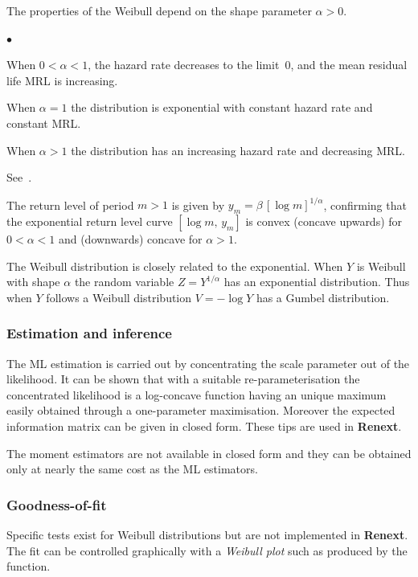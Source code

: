 \documentclass[a4paper]{report}
\begin{document}
The properties of the Weibull depend on the shape parameter $\alpha>0$. 

\begin{list}{$\bullet$}{\setlength{\itemsep}{2pt}\setlength{\topsep}{2pt}}
  
\item When $0 < \alpha < 1$, the hazard rate decreases to the
  limit~$0$, and the mean residual life MRL is increasing.
  
\item When $\alpha = 1$ the distribution is exponential with
  constant hazard rate and constant MRL.
  
\item When $\alpha > 1$ the distribution has an increasing hazard rate
  and decreasing MRL.

\end{list}
See~\citet{BAGNOLIBERGSTROM}.

The return level of period $m>1$ is given by $y_m = \beta \,\left[\log
  m\right]^{1/\alpha}$, confirming that the exponential return level
curve $[\log m,\, y_m]$ is convex (concave upwards) for $0 < \alpha <
1$ and (downwards) concave for $\alpha > 1$.

The Weibull distribution is closely related to the exponential.  When
$Y$ is Weibull with shape $\alpha$ the random variable
$Z=Y^{1/\alpha}$ has an exponential distribution.  Thus when $Y$
follows a Weibull distribution $V=-\log Y$ has a Gumbel distribution.

\subsubsection*{Estimation and inference}
The ML estimation is carried out by concentrating the scale parameter
out of the likelihood. It can be shown that with a suitable re-parameterisation
the concentrated likelihood  is a log-concave function having an unique maximum
easily obtained through a one-parameter maximisation.
Moreover the expected information matrix can be given in closed form. 
These tips are used in \textbf{Renext}.
%

The moment estimators are not available in closed form and they can be
obtained only at nearly the same cost as the ML estimators.


\subsubsection*{Goodness-of-fit}
Specific tests exist for Weibull distributions but are not implemented
in \textbf{Renext}. The fit can be controlled graphically
with a\textit{ Weibull plot} 
% 
such as produced by the \verb@weibplot@ function.
\end{document}
